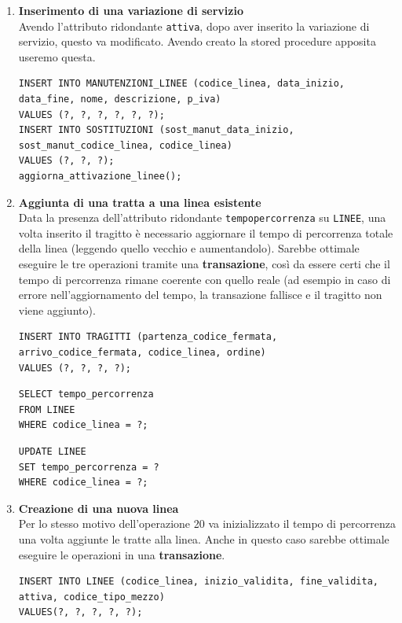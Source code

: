 \documentclass[12pt,a4paper]{report}
\begin{document}
\begin{enumerate}[label=\textbf{\arabic*)}]
\item \textbf{Inserimento di una variazione di servizio} \\
Avendo l'attributo ridondante \texttt{attiva}, dopo aver inserito la variazione di servizio, questo va modificato. Avendo creato la stored procedure apposita useremo questa.
\begin{lstlisting}[style=sqlstyle, caption=Insert into SOSTITUZIONI and Update LINEE status]
INSERT INTO MANUTENZIONI_LINEE (codice_linea, data_inizio, data_fine, nome, descrizione, p_iva)
VALUES (?, ?, ?, ?, ?, ?);
INSERT INTO SOSTITUZIONI (sost_manut_data_inizio, sost_manut_codice_linea, codice_linea)
VALUES (?, ?, ?);
aggiorna_attivazione_linee();
\end{lstlisting}

\item \textbf{Aggiunta di una tratta a una linea esistente} \\
Data la presenza dell'attributo ridondante \texttt{tempo{\textunderscore}percorrenza} su \texttt{LINEE}, una volta inserito il tragitto è necessario aggiornare il tempo di percorrenza totale della linea (leggendo quello vecchio e aumentandolo). Sarebbe ottimale eseguire le tre operazioni tramite una \textbf{transazione}, così da essere certi che il tempo di percorrenza rimane coerente con quello reale (ad esempio in caso di errore nell'aggiornamento del tempo, la transazione fallisce e il tragitto non viene aggiunto). \\
\begin{lstlisting}[style=sqlstyle, caption=Inserimento del tragitto]
INSERT INTO TRAGITTI (partenza_codice_fermata, arrivo_codice_fermata, codice_linea, ordine)
VALUES (?, ?, ?, ?);
\end{lstlisting}

\begin{lstlisting}[style=sqlstyle, caption=Lettura vecchio tempo di percorrenza]
SELECT tempo_percorrenza
FROM LINEE
WHERE codice_linea = ?;
\end{lstlisting}

\begin{lstlisting}[style=sqlstyle, caption=Aggiornamento del tempo di percorrenza]
UPDATE LINEE
SET tempo_percorrenza = ?
WHERE codice_linea = ?;
\end{lstlisting}

\item \textbf{Creazione di una nuova linea} \\
Per lo stesso motivo dell'operazione 20 va inizializzato il tempo di percorrenza una volta aggiunte le tratte alla linea. Anche in questo caso sarebbe ottimale eseguire le operazioni in una \textbf{transazione}.
\begin{lstlisting}[style=sqlstyle, caption=Inserimento linea]
INSERT INTO LINEE (codice_linea, inizio_validita, fine_validita, attiva, codice_tipo_mezzo)
VALUES(?, ?, ?, ?, ?);
\end{lstlisting}


\end{enumerate}
\end{document}
